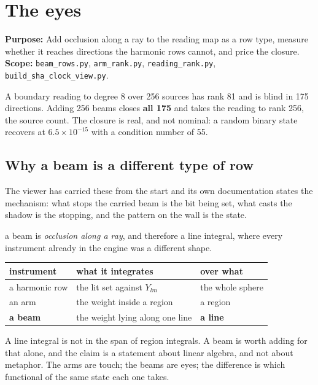 
\chapter{The eyes}

\textbf{Purpose:} Add occlusion along a ray to the reading map as a row type, measure whether it
reaches directions the harmonic rows cannot, and price the closure. \textbf{Scope:}
\texttt{beam\_rows.py}, \texttt{arm\_rank.py}, \texttt{reading\_rank.py},
\texttt{build\_sha\_clock\_view.py}.

A boundary reading to degree 8 over 256 sources has rank 81 and is blind in 175 directions. Adding
256 beams closes \textbf{all 175} and takes the reading to rank 256, the source count. The
closure is real, and not nominal: a random binary state recovers at \(6.5 \times 10^{-15}\) with a
condition number of 55.

\section{Why a beam is a different type of row}

The viewer has carried these from the start and its own documentation states the mechanism: what
stops the carried beam is the bit being set, what casts the shadow is the stopping, and the pattern
on the wall is the state.

a beam is \emph{occlusion along a ray}, and therefore a line integral, where every instrument
already in the engine was a different shape.

\begin{center}
\begin{tabular}{@{}lll@{}}
\toprule
instrument & what it integrates & over what \\
\midrule
a harmonic row & the lit set against \(Y_{lm}\) & the whole sphere \\
an arm & the weight inside a region & a region \\
\textbf{a beam} & the weight lying along one line & \textbf{a line} \\
\bottomrule
\end{tabular}
\end{center}

A line integral is not in the span of region integrals. A beam is worth adding for that alone, and the claim
is a statement about linear algebra, and not about metaphor. The arms are touch; the beams are
eyes; the difference is which functional of the same state each one takes.

